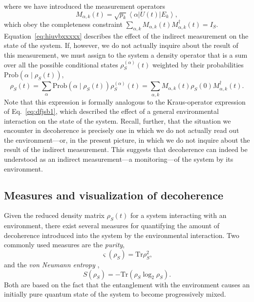 \documentclass[3p,sort&compress,12pt]{elsarticle}
\newcommand{\bra}[1]{\left\langle{#1}\right\vert}
\newcommand{\ket}[1]{\left\vert{#1}\right\rangle}
\newcommand{\op}[1]{#1}
\begin{document}
%
where we have introduced the measurement operators
%
\begin{equation}
M_{\alpha,k}(t) = \sqrt{p_k} \bra{\alpha} U(t) \ket{E_k},
\end{equation}
%
which obey the completeness constraint $\sum_{\alpha,k}M_{\alpha,k}(t)M_{\alpha,k}^\dagger(t)=I_S$. Equation~\eqref{eq:hiuvbxxxxx} describes the effect of the indirect measurement on the state of the system. If, however, we do not actually inquire about the result of this measurement, we must assign to the system a density operator that is a sum over all the possible conditional states $\op{\rho}_S^{(\alpha)}(t)$ weighted by their probabilities $\text{Prob}\left(\alpha \mid \op{\rho}_S(t)\right)$,
%
\begin{equation}
\op{\rho}_S(t) = \sum_\alpha \text{Prob}\left(\alpha \mid \op{\rho}_S(t)\right) \op{\rho}_S^{(\alpha)}(t) = \sum_{\alpha,k} M_{\alpha,k}(t)  \op{\rho}_S(0) M^\dagger_{\alpha,k}(t).
\end{equation}
%
Note that this expression is formally analogous to the Kraus-operator expression of Eq.~\eqref{eq:dfjsb1}, which described the effect of a general environmental interaction on the state of the system. Recall, further, that the situation we encounter in decoherence is precisely one in which we do not actually read out the environment---or, in the present picture, in which we do not inquire about the result of the indirect measurement. This suggests that decoherence can indeed be understood as an indirect measurement---a monitoring---of the system by its environment.

\subsection{\label{sec:meas}Measures and visualization of decoherence}

Given the reduced density matrix $\op{\rho}_S(t)$ for a system interacting with an environment, there exist several measures for quantifying the amount of decoherence introduced into the system by the environmental interaction. Two commonly used measures are the \emph{purity},
%
\begin{equation}
\label{eq:puri}
\varsigma(\op{\rho}_S) = \text{Tr} \op{\rho}_S^2,
\end{equation}
%
and the \emph{von Neumann entropy} \cite{VonNeumann:1926:tv},
%
\begin{equation}
\label{eq:ent}
S(\op{\rho}_S) = - \text{Tr}\left( \op{\rho}_S \log_2 \op{\rho}_S \right).
\end{equation}
%
Both are based on the fact that the entanglement with the environment causes an initially pure quantum state of the system to become progressively mixed.
\end{document}
